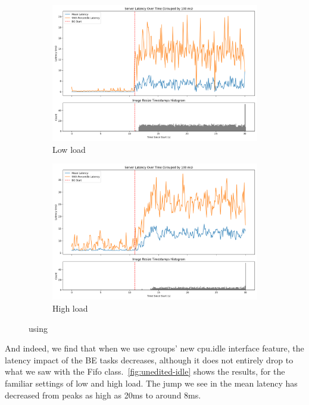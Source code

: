 \begin{figure}[t]
    \centering
    \begin{subfigure}[t]{0.49\columnwidth}
        \includegraphics[width=\columnwidth]{graphs/unedited-idle-low-two.png}
        \caption{Low load}\label{fig:unedited-idle-low-two}
    \end{subfigure}
    \hspace{\fill}
    \begin{subfigure}[t]{0.49\columnwidth}
        \includegraphics[width=\columnwidth]{graphs/unedited-idle-high-two.png}
        \caption{High load}\label{fig:unedited-idle-high-two}
    \end{subfigure}
    \vspace{4pt}
    \caption{using \schedidle{}}\label{fig:unedited-idle}
\end{figure}

And indeed, we find that when we use cgroups' new cpu.idle interface feature,
the latency impact of the BE tasks decreases, although it does not entirely drop
to what we saw with the Fifo class.\ \autoref{fig:unedited-idle} shows the
results, for the familiar settings of low and high load. The jump we see in the
mean latency has decreased from peaks as high as 20ms to around 8ms.

